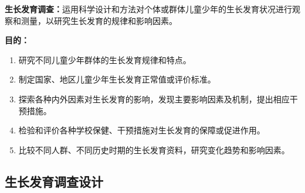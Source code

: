 \begin{defbox}
\textbf{生长发育调查：}运用科学设计和方法对个体或群体儿童少年的生长发育状况进行观察和测量，以研究生长发育的规律和影响因素。

\textbf{目的：}
\begin{enumerate}[leftmargin=*]
    \item 研究不同儿童少年群体的生长发育规律和特点。
    \item 制定国家、地区儿童少年生长发育正常值或评价标准。
    \item 探索各种内外因素对生长发育的影响，发现主要影响因素及机制，提出相应干预措施。
    \item 检验和评价各种学校保健、干预措施对生长发育的保障或促进作用。
    \item 比较不同人群、不同历史时期的生长发育资料，研究变化趋势和影响因素。
\end{enumerate}
\end{defbox}

\subsection{生长发育调查设计}

